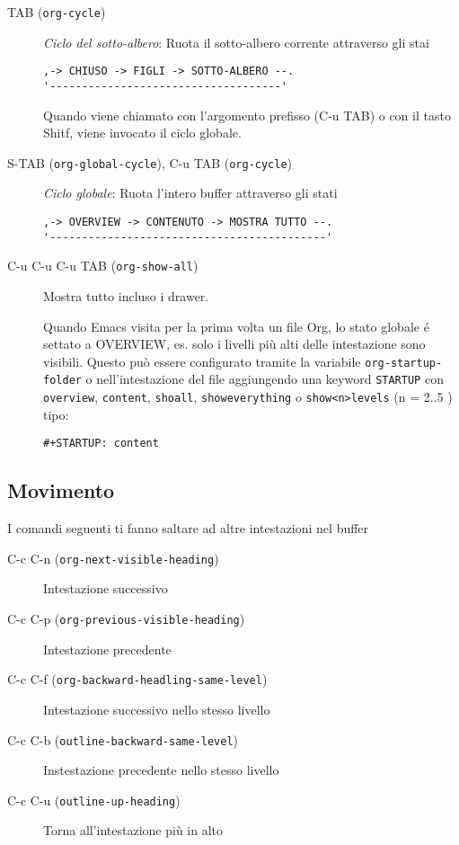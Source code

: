 \documentclass[11pt]{article}
\begin{document}
\begin{description}
\item[{TAB (\texttt{org-cycle})}] \emph{Ciclo del sotto-albero}: Ruota il sotto-albero corrente attraverso gli stai

\begin{verbatim}
,-> CHIUSO -> FIGLI -> SOTTO-ALBERO --.
'------------------------------------'
\end{verbatim}


Quando viene chiamato con l'argomento prefisso (C-u TAB) o con
il tasto Shitf, viene invocato il ciclo globale.

\item[{S-TAB (\texttt{org-global-cycle}), C-u TAB (\texttt{org-cycle})}] \emph{Ciclo globale}: Ruota l'intero buffer attraverso gli stati

\begin{verbatim}
,-> OVERVIEW -> CONTENUTO -> MOSTRA TUTTO --.
'-------------------------------------------'
\end{verbatim}

\item[{C-u C-u C-u TAB (\texttt{org-show-all})}] Mostra tutto incluso i drawer.

Quando Emacs visita per la prima volta un file Org, lo stato globale
é settato a OVERVIEW, es. solo i livelli più alti delle intestazione
sono visibili. Questo può essere configurato tramite la variabile
\texttt{org-startup-folder} o nell'intestazione del file aggiungendo una
keyword \texttt{STARTUP} con \texttt{overview}, \texttt{content}, \texttt{shoall},
\texttt{showeverything} o \texttt{show<n>levels} (n = 2..5 ) tipo:

\begin{verbatim}
#+STARTUP: content
\end{verbatim}
\end{description}

\subsection{Movimento}
\label{sec:orge9cca99}
I comandi seguenti ti fanno saltare ad altre intestazioni nel buffer

\begin{description}
\item[{C-c C-n (\texttt{org-next-visible-heading})}] Intestazione successivo
\item[{C-c C-p (\texttt{org-previous-visible-heading})}] Intestazione precedente

\item[{C-c C-f (\texttt{org-backward-headling-same-level})}] Intestazione successivo nello stesso livello

\item[{C-c C-b (\texttt{outline-backward-same-level})}] Instestazione precedente nello stesso livello

\item[{C-c C-u (\texttt{outline-up-heading})}] Torna all'intestazione
più in alto
\end{description}
\end{document}
